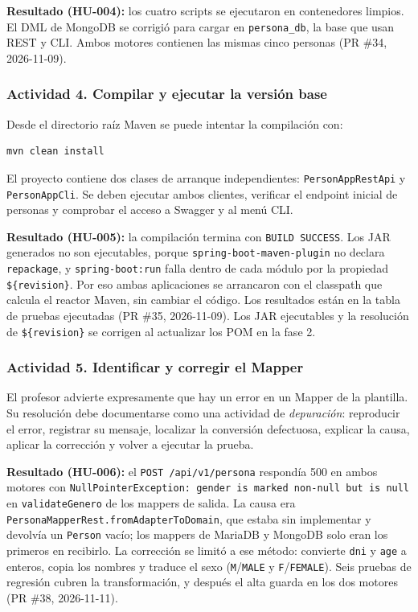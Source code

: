 \documentclass[11pt,a4paper]{article}
\begin{document}
\textbf{Resultado (HU-004):} los cuatro scripts se ejecutaron en contenedores
limpios. El DML de MongoDB se corrigió para cargar en \texttt{persona\_db}, la base
que usan REST y CLI. Ambos motores contienen las mismas cinco personas
(PR \#34, 2026-11-09).

\subsubsection*{Actividad 4. Compilar y ejecutar la versión base}
Desde el directorio raíz Maven se puede intentar la compilación con:
\begin{verbatim}
mvn clean install
\end{verbatim}
El proyecto contiene dos clases de arranque independientes:
\texttt{PersonAppRestApi} y \texttt{PersonAppCli}. Se deben ejecutar
ambos clientes, verificar el endpoint inicial de personas y comprobar
el acceso a Swagger y al menú CLI.

\textbf{Resultado (HU-005):} la compilación termina con \texttt{BUILD SUCCESS}.
Los JAR generados no son ejecutables, porque \texttt{spring-boot-maven-plugin}
no declara \texttt{repackage}, y \texttt{spring-boot:run} falla dentro de cada
módulo por la propiedad \texttt{\$\{revision\}}. Por eso ambas aplicaciones se
arrancaron con el classpath que calcula el reactor Maven, sin cambiar el código.
Los resultados están en la tabla de pruebas ejecutadas (PR \#35, 2026-11-09).
Los JAR ejecutables y la resolución de \texttt{\$\{revision\}} se corrigen al
actualizar los POM en la fase 2.

\subsubsection*{Actividad 5. Identificar y corregir el Mapper}
El profesor advierte expresamente que hay un error en un Mapper de la
plantilla. Su resolución debe documentarse como una actividad de
\emph{depuración}: reproducir el error, registrar su mensaje, localizar
la conversión defectuosa, explicar la causa, aplicar la corrección y
volver a ejecutar la prueba.

\textbf{Resultado (HU-006):} el \texttt{POST /api/v1/persona} respondía 500 en
ambos motores con \texttt{NullPointerException: gender is marked non-null but is
null} en \texttt{validateGenero} de los mappers de salida. La causa era
\texttt{PersonaMapperRest.fromAdapterToDomain}, que estaba sin implementar y
devolvía un \texttt{Person} vacío; los mappers de MariaDB y MongoDB solo eran los
primeros en recibirlo. La corrección se limitó a ese método: convierte
\texttt{dni} y \texttt{age} a enteros, copia los nombres y traduce el sexo
(\texttt{M}/\texttt{MALE} y \texttt{F}/\texttt{FEMALE}). Seis pruebas de regresión
cubren la transformación, y después el alta guarda en los dos motores (PR \#38,
2026-11-11).
\end{document}
